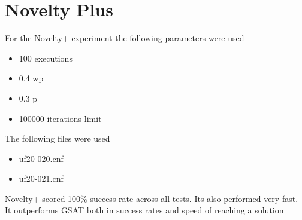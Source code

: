 \section{Novelty Plus}

For the Novelty+ experiment the following parameters were used

\begin{itemize}
  \item 100 executions
  \item 0.4 wp
  \item 0.3 p
  \item 100000 iterations limit
\end{itemize}

The following files were used 

\begin{itemize}
  \item uf20-020.cnf
  \item uf20-021.cnf
\end{itemize}

\begin{table}[H]
\end{table}

Novelty+ scored 100\% success rate across all tests. Its also performed very fast. It outperforms GSAT both in success rates and speed of reaching a solution